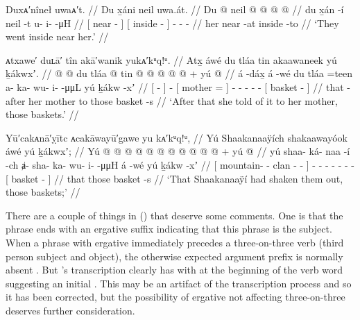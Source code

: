 \ex\label{ex:92-194-went-inside-near}%
%
\begingl
	\glpreamble	Duxᴀ′nîneł uwaᴀ′t. //
	\glpreamble	Du x̱áni neil uwa.át. //
	\gla	{} Du  @ {} {} {} neil @ {} {}
		 @ {} @ {} @ {} //
	\glb	{} du x̱án -í {} {} neil -t {}
		u- i-  -μH //
	\glc	{}[  near - {}] {}[ inside - {}]
		- -  - //
	\gld	{} her near -at {} {} inside -to {}
		 {} {} {} //
	\glft	‘They went inside near her.’
		//
\endgl
\xe

\ex\label{ex:92-195-told-mother-baskets}%
%
\begingl
	\glpreamble	ᴀtxawe′ duʟā′ tîn akā′wanik yukᴀ′kᵘq!ᵘ. //
	\glpreamble	Atx̱ áwé du tláa tin akaawaneek yú ḵákwxʼ. //
	\gla	{}  @ {} {}  @ {}
		{} du tláa @ \•tin {}
		 @ {} @ {} @ {} @ {} @ {} +
		{} yú  @ {} {} //
	\glb	{} á -dáx̱ {} á -wé
		{} du tláa =teen {}
		a- ka- wu- i-  -μμL
		{} yú ḵákw -xʼ {} //
	\glc	{}[  - {}]  -
		{}[  mother = {}]
		- - - -  -
		{}[  basket - {}] //
	\gld	{} that -after {}  {}
		{} her mother \•to {}
		 {} {} {} {} {}
		{} those basket -s {} //
	\glft	‘After that she told of it to her mother, those baskets.’
		//
\endgl
\xe

\ex\label{ex:92-196-shook-out-baskets}%
%
\begingl
	\glpreamble	Yū′cakᴀnā′ỵītc ᴀcakāwayū′gawe yu kᴀ′kᵘq!ᵘ, //
	\glpreamble	Yú Shaakanaaÿích shakaawayóok áwé yú ḵákwxʼ; //
	\gla	{} Yú  @ {} @ {} @ {} @ {} {}
		 @ {} @ {} @ {} @ {} @ {} @ {}
		 @ {} +
		{} yú  @ {} {} //
	\glb	{} yú shaa- ká- naa -í -ch {}
		ⱥ- sha- ka- wu- i-  -μμH
		á -wé
		{} yú ḵákw -xʼ {} //
	\glc	{}[  mountain- - clan - - {}]
		- - - - -  -
		 -
		{}[  basket - {}] //
	\gld	{} that  {} {} {} {} {}
		 {} {} {} {} {} {}
		 {}
		{} those basket -s {} //
	\glft	‘That Shaakanaaÿí had shaken them out, those baskets;’
		//
\endgl
\xe

There are a couple of things in (\lastx) that deserve some comments.
One is that the phrase  ends with an ergative suffix  indicating that this phrase is the subject.
When a phrase with ergative  immediately precedes a three-on-three verb (third person subject and object), the otherwise expected  argument prefix is normally absent \parencites[25 fn.\ 12]{leer:1991}{crippen:2016}[724]{crippen:2019}.
But \citeauthor{swanton:1909}’s transcription clearly has  with  at the beginning of the verb word suggesting an initial .
This may be an artifact of the transcription process and so it has been corrected, but the possibility of ergative  not affecting three-on-three  deserves further consideration.

